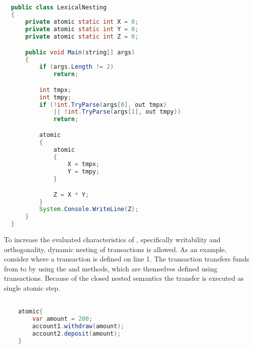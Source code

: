 \begin{lstlisting}[label=lst:stm_syntax_lexical_nesting,
  caption={Lexical Nesting},
  language=Java,  
  showspaces=false,
  showtabs=false,
  breaklines=true,
  showstringspaces=false,
  breakatwhitespace=true,
  commentstyle=\color{greencomments},
  keywordstyle=\color{bluekeywords},
  stringstyle=\color{redstrings},
  morekeywords={atomic, retry, orelse, var, get, set, using}]  % Start your code-block

  public class LexicalNesting
  {
      private atomic static int X = 0;
      private atomic static int Y = 0;
      private atomic static int Z = 0;

      public void Main(string[] args)
      {
          if (args.Length != 2)
              return;

          int tmpx;
          int tmpy;
          if (!int.TryParse(args[0], out tmpx) 
              || !int.TryParse(args[1], out tmpy))
              return;

          atomic
          {
              atomic
              {
                  X = tmpx;
                  Y = tmpy;
              }

              Z = X * Y;
          }
          System.Console.WriteLine(Z);
      }
  }
\end{lstlisting}

To increase the evaluated characteristics\cite[p. 15-21]{dpt907e14trending} of \stmname, specifically writability and orthogonality, dynamic nesting of transactions is allowed. As an example, consider  where a transaction is defined on line 1. The transaction transfers funds from  to  by using the  and  methods, which are themselves defined using transactions. Because of the closed nested semantics the transfer is executed as single atomic step.


\begin{lstlisting}[label=lst:stm_nested_transactions_real,
  caption={Dynamically nested transactions},
  language=Java,  
  showspaces=false,
  showtabs=false,
  breaklines=true,
  showstringspaces=false,
  breakatwhitespace=true,
  commentstyle=\color{greencomments},
  keywordstyle=\color{bluekeywords},
  stringstyle=\color{redstrings},
  morekeywords={atomic, retry, orElse, var}]  % Start your code-block

	atomic{
		var amount = 200;
		account1.withdraw(amount);
		account2.deposit(amount);
	}
       
\end{lstlisting}

